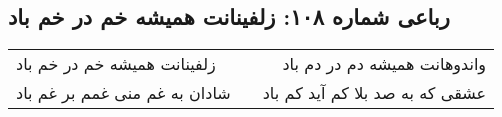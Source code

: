 \begin{center}
\section*{رباعی شماره ۱۰۸: زلفینانت همیشه خم در خم باد}
\label{sec:sh108}
\begin{longtable}{l p{0.5cm} r}
زلفینانت همیشه خم در خم باد
&&
واندوهانت همیشه دم در دم باد
\\
شادان به غم منی غمم بر غم باد
&&
عشقی که به صد بلا کم آید کم باد
\\
\end{longtable}
\end{center}
